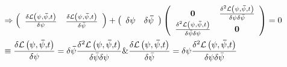 \documentclass[aps,preprint]{revtex4}%
\begin{document}
\begin{align}
&  \Rightarrow\left(
\begin{array}
[c]{cc}%
\frac{\delta\mathcal{L}\left(  \mathbf{\psi},\mathbf{\bar{\psi},}t\right)
}{\delta\psi} & \frac{\delta\mathcal{L}\left(  \mathbf{\psi},\mathbf{\bar
{\psi},}t\right)  }{\delta\bar{\psi}}%
\end{array}
\right)  +\left(
\begin{array}
[c]{cc}%
\delta\mathbf{\psi} & \delta\mathbf{\bar{\psi}}%
\end{array}
\right)  \left(
\begin{array}
[c]{cc}%
\mathbf{0} & \frac{\delta^{2}\mathcal{L}\left(  \mathbf{\psi},\mathbf{\bar
{\psi},}t\right)  }{\delta\psi\delta\bar{\psi}}\\
\frac{\delta^{2}\mathcal{L}\left(  \mathbf{\psi},\mathbf{\bar{\psi},}t\right)
}{\delta\bar{\psi}\delta\psi} & \mathbf{0}%
\end{array}
\right)  =0\\
&  \equiv\frac{\delta\mathcal{L}\left(  \mathbf{\psi},\mathbf{\bar{\psi}%
,}t\right)  }{\delta\psi}=\delta\mathbf{\bar{\psi}}\frac{\delta^{2}%
\mathcal{L}\left(  \mathbf{\psi},\mathbf{\bar{\psi},}t\right)  }{\delta
\bar{\psi}\delta\psi}\&\frac{\delta\mathcal{L}\left(  \mathbf{\psi
},\mathbf{\bar{\psi},}t\right)  }{\delta\bar{\psi}}=\delta\mathbf{\psi}%
\frac{\delta^{2}\mathcal{L}\left(  \mathbf{\psi},\mathbf{\bar{\psi},}t\right)
}{\delta\psi\delta\bar{\psi}}%
\end{align}
\end{document}
